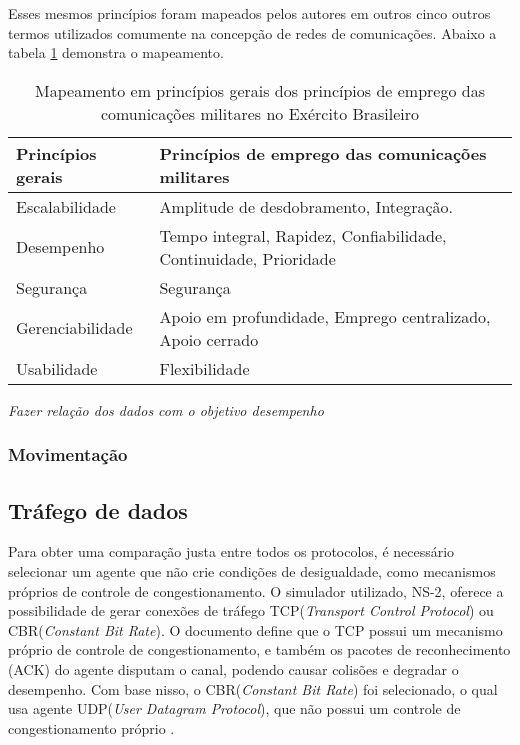 Esses mesmos princ\'ipios foram mapeados pelos autores \cite{salles} em outros cinco outros termos utilizados comumente na concep\c{c}\~ao de redes de comunica\c{c}\~oes. Abaixo a tabela \ref{tabExer} demonstra o mapeamento.
\begin{table}[H]
	\centering
	\caption{Mapeamento em princ\'ipios gerais dos princ\'ipios de emprego das comunica\c{c}\~oes militares no Ex\'ercito Brasileiro \cite{salles}}
	\begin{tabular}{ | l | l | }
		\hline
		\textbf{Princ\'ipios gerais} & \textbf{Princ\'ipios de emprego das comunica\c{c}\~oes militares} \\ \hline
		Escalabilidade & Amplitude de desdobramento, Integra\c{c}\~ao. \\ \hline
		Desempenho & Tempo integral, Rapidez, Confiabilidade, Continuidade, Prioridade \\ \hline
		Seguran\c{c}a & Seguran\c{c}a \\ \hline
		Gerenciabilidade & Apoio em profundidade, Emprego centralizado, Apoio cerrado \\ \hline
		Usabilidade & Flexibilidade \\ \hline
	\end{tabular}
	\label{tabExer}
\end{table}

\textit{Fazer rela\c{c}\~ao dos dados com o objetivo desempenho}

\subsubsection{Movimenta\c{c}\~ao}

\subsection{Tr\'afego de dados}\label{trafegoDados}
Para obter uma compara\c{c}\~ao justa entre todos os protocolos, \'e necess\'ario selecionar um agente que n\~ao crie condi\c{c}\~oes de desigualdade, como mecanismos pr\'oprios de controle de congestionamento.
O simulador utilizado, NS-2, oferece a possibilidade de gerar conex\~oes de tr\'afego TCP(\textit{Transport Control Protocol}) ou CBR(\textit{Constant Bit Rate}).
O documento \cite{rfc793} define que o TCP possui um mecanismo pr\'oprio de controle de congestionamento, e tamb\'em os pacotes de reconhecimento (ACK) do agente disputam o canal, podendo causar colis\~oes e degradar o desempenho.
Com base nisso, o CBR(\textit{Constant Bit Rate}) foi selecionado, o qual usa agente UDP(\textit{User Datagram Protocol}), que n\~ao possui um controle de congestionamento pr\'oprio \cite{rfc768}.
